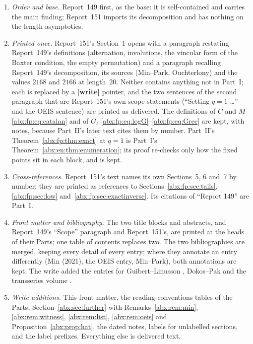 \documentclass[11pt,letterpaper]{article}
\numberwithin{equation}{section}
\theoremstyle{remark}\newtheorem{remark}[theorem]{Remark}
\begin{document}
\begin{enumerate}
\item \emph{Order and base.} Report~149 first, as the base: it is self-contained and carries the main finding; Report~151 imports its decomposition and has nothing on the length asymptotics.
\item \emph{Printed once.} Report~151's Section~1 opens with a paragraph restating Report~149's definitions (alternation, involutions, the vincular form of the Baxter condition, the empty permutation) and a paragraph recalling Report~149's decomposition, its sources (Min--Park, Ouchterlony) and the values $2168$ and $2166$ at length~20. Neither contains anything not in Part~I; each is replaced by a \textbf{[write]} pointer, and the two sentences of the second paragraph that are Report~151's own scope statements (``Setting $q=1$ \ldots'' and the OEIS sentence) are printed as delivered. The definitions of $C$ and $M$ \eqref{abx:fp:eq:catalan} and of $G_\ell$ \eqref{abx:fp:eq:logG}--\eqref{abx:fp:eq:Grec} are kept, with notes, because Part~II's later text cites them by number. Part~II's Theorem~\ref{abx:fp:thm:exact} at $q=1$ is Part~I's Theorem~\ref{abx:en:thm:enumeration}; its proof re-checks only how the fixed points sit in each block, and is kept.
\item \emph{Cross-references.} Report~151's text names its own Sections~5, 6 and~7 by number; they are printed as references to Sections~\ref{abx:fp:sec:tails}, \ref{abx:fp:sec:low} and~\ref{abx:fp:sec:exactinverse}. Its citations of ``Report 149'' are Part~I.
\item \emph{Front matter and bibliography.} The two title blocks and abstracts, and Report~149's ``Scope'' paragraph and Report~151's, are printed at the heads of their Parts; one table of contents replaces two. The two bibliographies are merged, keeping every detail of every entry; where they annotate an entry differently (Min (2021), the OEIS entry, Min--Park), both annotations are kept. The write added the entries for Guibert--Linusson \cite{GL}, Dokos--Pak \cite{DP} and the transseries volume \cite{TSvol}.
\item \emph{Write additions.} This front matter, the reading-conventions tables of the Parts, Section~\ref{abx:sec:further} with Remarks~\ref{abx:rem:min}, \ref{abx:rem:witness}, \ref{abx:rem:list}, \ref{abx:rem:oeis} and Proposition~\ref{abx:prop:hat}, the dated notes, labels for unlabelled sections, and the label prefixes. Everything else is delivered text.
\end{enumerate}
\end{document}

